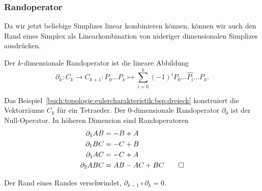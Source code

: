 %
%
\subsubsection{Randoperator}
Da wir jetzt beliebige Simplizes linear kombinieren können, können
wir auch den Rand eines Simplex als Linearkombination von nideriger
dimensionalen Simplizes ausdrücken.

\begin{definition}[Randoperator]
Der $k$-dimensionale Randoperator ist die lineare Abbildung
\[
\partial_k
\colon
C_k \to C_{k+1}
:
P_0\dots P_k
\mapsto
\sum_{i=0}^k
(-1)^i
P_0\dots\widehat{P_i}\dots P_k.
\]
%
\end{definition}

\begin{beispiel}
Das Beispiel~\ref{buch:topologie:eulercharakteristik:bsp:dreieck}
konstruiert die Vektorräume $C_k$ für ein Tetraeder.
Der $0$-dimensionale Randoperator $\partial_0$ ist der Null-Operator.
In höheren Dimension sind Randoperatoren
\begin{align*}
\partial_1 AB &= -B + A \\
\partial_1 BC &= -C + B \\
\partial_1 AC &= -C + A \\
\partial_2 ABC &= AB - AC + BC
\qedhere
\end{align*}
\end{beispiel}

\begin{satz}
Der Rand eines Randes verschwindet, $\partial_{k-1}\circ\partial_k=0$.
\end{satz}

